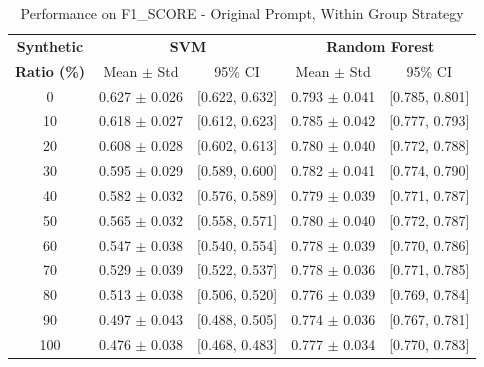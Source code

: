\begin{table}[h]
\centering
\caption{Performance on F1_SCORE - Original Prompt, Within Group Strategy}
\label{tab:original_within_group_f1_score}
\begin{tabular}{c|cc|cc}
\hline
\textbf{Synthetic} & \multicolumn{2}{c|}{\textbf{SVM}} & \multicolumn{2}{c}{\textbf{Random Forest}} \\
\textbf{Ratio (\%)} & Mean $\pm$ Std & 95\% CI & Mean $\pm$ Std & 95\% CI \\
\hline
0 & 0.627 $\pm$ 0.026 & [0.622, 0.632] & 0.793 $\pm$ 0.041 & [0.785, 0.801] \\
10 & 0.618 $\pm$ 0.027 & [0.612, 0.623] & 0.785 $\pm$ 0.042 & [0.777, 0.793] \\
20 & 0.608 $\pm$ 0.028 & [0.602, 0.613] & 0.780 $\pm$ 0.040 & [0.772, 0.788] \\
30 & 0.595 $\pm$ 0.029 & [0.589, 0.600] & 0.782 $\pm$ 0.041 & [0.774, 0.790] \\
40 & 0.582 $\pm$ 0.032 & [0.576, 0.589] & 0.779 $\pm$ 0.039 & [0.771, 0.787] \\
50 & 0.565 $\pm$ 0.032 & [0.558, 0.571] & 0.780 $\pm$ 0.040 & [0.772, 0.787] \\
60 & 0.547 $\pm$ 0.038 & [0.540, 0.554] & 0.778 $\pm$ 0.039 & [0.770, 0.786] \\
70 & 0.529 $\pm$ 0.039 & [0.522, 0.537] & 0.778 $\pm$ 0.036 & [0.771, 0.785] \\
80 & 0.513 $\pm$ 0.038 & [0.506, 0.520] & 0.776 $\pm$ 0.039 & [0.769, 0.784] \\
90 & 0.497 $\pm$ 0.043 & [0.488, 0.505] & 0.774 $\pm$ 0.036 & [0.767, 0.781] \\
100 & 0.476 $\pm$ 0.038 & [0.468, 0.483] & 0.777 $\pm$ 0.034 & [0.770, 0.783] \\
\hline
\end{tabular}
\end{table}